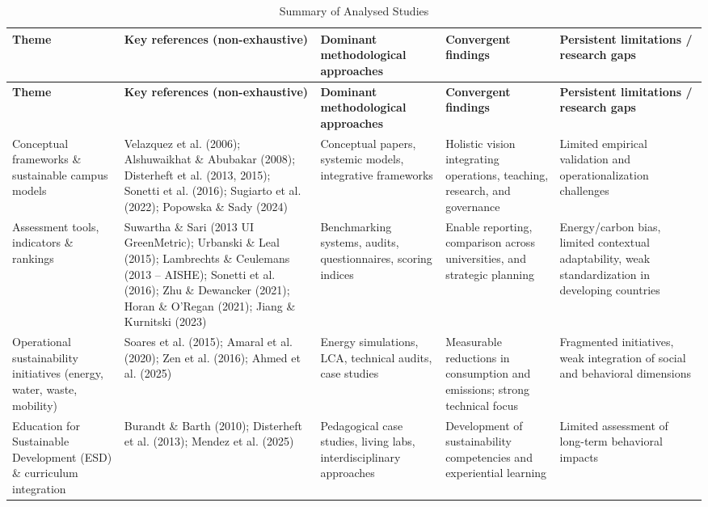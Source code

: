 \documentclass[12pt,a4paper]{article}
\begin{document}
\begin{longtable}{p{3cm} p{4cm} p{3cm} p{3cm} p{3cm}}
\caption{Summary of Analysed Studies} \\

\hline
\textbf{Theme} & \textbf{Key references (non-exhaustive)} & 
\textbf{Dominant methodological approaches} & 
\textbf{Convergent findings} & 
\textbf{Persistent limitations / research gaps} \\
\hline
\endfirsthead

\hline
\textbf{Theme} & \textbf{Key references (non-exhaustive)} & 
\textbf{Dominant methodological approaches} & 
\textbf{Convergent findings} & 
\textbf{Persistent limitations / research gaps} \\
\hline
\endhead

Conceptual frameworks \& sustainable campus models &
Velazquez et al. (2006); Alshuwaikhat \& Abubakar (2008); 
Disterheft et al. (2013, 2015); Sonetti et al. (2016); 
Sugiarto et al. (2022); Popowska \& Sady (2024) &
Conceptual papers, systemic models, integrative frameworks &
Holistic vision integrating operations, teaching, research, and governance &
Limited empirical validation and operationalization challenges \\

Assessment tools, indicators \& rankings &
Suwartha \& Sari (2013 UI GreenMetric); Urbanski \& Leal (2015); 
Lambrechts \& Ceulemans (2013 – AISHE); Sonetti et al. (2016); 
Zhu \& Dewancker (2021); Horan \& O’Regan (2021); 
Jiang \& Kurnitski (2023) &
Benchmarking systems, audits, questionnaires, scoring indices &
Enable reporting, comparison across universities, and strategic planning &
Energy/carbon bias, limited contextual adaptability, weak standardization in developing countries \\

Operational sustainability initiatives (energy, water, waste, mobility) &
Soares et al. (2015); Amaral et al. (2020); Zen et al. (2016); 
Ahmed et al. (2025) &
Energy simulations, LCA, technical audits, case studies &
Measurable reductions in consumption and emissions; strong technical focus &
Fragmented initiatives, weak integration of social and behavioral dimensions \\

Education for Sustainable Development (ESD) \& curriculum integration &
Burandt \& Barth (2010); Disterheft et al. (2013); 
Mendez et al. (2025) &
Pedagogical case studies, living labs, interdisciplinary approaches &
Development of sustainability competencies and experiential learning &
Limited assessment of long-term behavioral impacts \\


\end{longtable}
\end{document}
